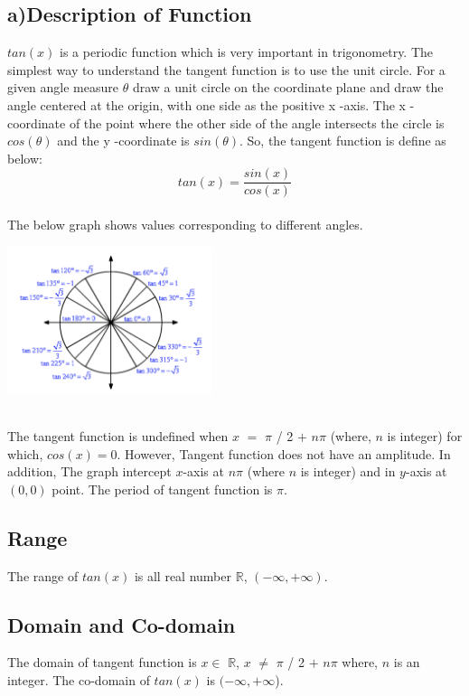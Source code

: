 \documentclass[letterpaper, 11pt]{report}
\begin{document}
\subsection*{a)Description of Function}
 \normalsize{ \cite{test1} $tan(x)$  is a periodic function which is very important in trigonometry. The simplest way to understand the tangent function is to use the unit circle. For a given angle measure $\theta$ draw a unit circle on the coordinate plane and draw the angle centered at the origin, with one side as the positive  x -axis. The  x -coordinate of the point where the other side of the angle intersects the circle is $cos(θ)$ and the  y -coordinate is $sin(θ)$. So, the tangent function is define as below: \[tan(x) = \frac{sin(x)}{cos(x)}\]\\}
The below graph shows values corresponding to different angles.
 \begin{center}
\includegraphics[width= 6cm]{images/tan3.png}
\end{center}
 \\
 \normalsize{ \cite{test1}\cite{varsitytutors}The tangent function is undefined when $x$ $=$ $\pi$ / 2 $+$ $n \pi$ (where, $n$ is integer) for which, $cos(x) = 0$. However, Tangent function does not have an amplitude. In addition, The graph intercept $x$-axis at $n\pi$ (where $n$ is integer) and in $y$-axis at $(0,0)$ point. The period of tangent function is $\pi$.
 }
 \\
 \subsection*{Range}\cite{test1}\cite{varsitytutors}
 \normalsize{ The range of $tan(x)$ is all real number $\mathbb{R}$, $(- \infty, + \infty)$. }
 
 \subsection*{Domain and Co-domain}\cite{test1}\cite{varsitytutors}
 \normalsize{The domain of tangent function is $x \in$ $\mathbb{R}$, $x$ $\neq$ $\pi$ / 2 $+$ $n \pi$ where, $n$ is an integer. The co-domain of $tan(x)$ is \((-\infty, +\infty\)).}
\end{document}
